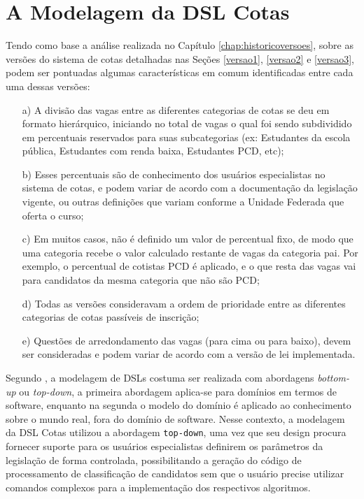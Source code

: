 \section{A Modelagem da DSL Cotas}
\label{sec:dslproposta:usuario}

   
 Tendo como base a análise realizada no Capítulo \ref{chap:historicoversoes}, sobre as versões do sistema de cotas detalhadas nas Seções \ref{versao1}, \ref{versao2} e \ref{versao3}, podem ser  pontuadas algumas características em comum identificadas entre cada uma dessas versões:
   
   \begin{enumerate}
    \item[a)] A divisão das vagas entre as diferentes categorias de cotas se deu em formato hierárquico, iniciando no total de vagas o qual foi sendo subdividido em percentuais reservados para suas subcategorias (ex: Estudantes da escola pública, Estudantes com renda baixa, Estudantes PCD, etc); 
   
   \item[b)] Esses percentuais são de conhecimento dos usuários especialistas no sistema de cotas, e podem variar de acordo com a documentação da legislação vigente, ou outras definições que variam conforme a Unidade Federada que oferta o curso; 
   
   \item[c)] Em muitos casos, não é definido um valor de percentual fixo, de modo que uma categoria recebe o valor calculado restante de vagas da categoria pai. Por exemplo, o percentual de cotistas \gls{PCD} é aplicado, e o que resta das vagas vai para candidatos da mesma categoria que não são \gls{PCD};

   \item[d)] Todas as versões consideravam a ordem de prioridade entre as diferentes categorias de cotas passíveis de inscrição;
   
   \item[e)] Questões de arredondamento das vagas (para cima ou para baixo), devem ser consideradas e podem variar de acordo com a versão de lei implementada.

   \end{enumerate}
   
   Segundo , a modelagem de DSLs costuma ser realizada com abordagens \textit{bottom-up} ou \textit{top-down}, a primeira abordagem aplica-se para domínios em termos de software, enquanto na segunda o modelo do domínio é aplicado ao conhecimento sobre o mundo real, fora do domínio de software. Nesse contexto, a modelagem da DSL Cotas utilizou a abordagem \texttt{top-down}, uma vez que seu design procura fornecer suporte para os usuários especialistas definirem os parâmetros da legislação de forma controlada, possibilitando a geração do código de processamento de classificação de candidatos sem que o usuário precise utilizar comandos complexos para a implementação dos respectivos algoritmos.
   
